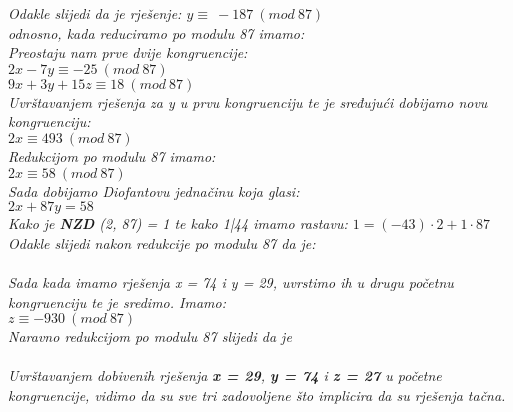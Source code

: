 \documentclass[12pt]{article}
\begin{document}
\begin{enumerate}
\begin{center}
        \textit{Odakle slijedi da je rješenje: $y \equiv \ -187 \ (mod\ 87)$\\ odnosno, kada reduciramo po modulu 87 imamo: }
        \vspace*{0.25cm}
        \textit{\\Preostaju nam prve dvije kongruencije:\\$2x - 7y \equiv -25\ (mod\ 87)$\\$9x + 3y + 15z \equiv 18\ (mod\ 87)$\\Uvrštavanjem rješenja za y u prvu kongruenciju te je sređujući dobijamo novu kongruenciju:\\$2x \equiv 493\ (mod\ 87)$\\ \vspace*{0.25cm}Redukcijom po modulu 87 imamo:\\$2x \equiv 58\ (mod\ 87)$\\\vspace*{0.25cm}Sada dobijamo Diofantovu jednačinu koja glasi:\\$2x + 87y = 58$\\\vspace*{0.25cm}
        Kako je \textbf{NZD} (2, 87) = 1 te kako 1|44 imamo rastavu:
        $1 = (-43) \cdot 2 + 1 \cdot 87$\\}
           \vspace*{0.25cm}
           \textit{Odakle slijedi nakon redukcije po modulu 87 da je:\\ \\}
           \vspace{0.25cm}
           \textit{Sada kada imamo rješenja x = 74 i y = 29, uvrstimo ih u drugu početnu kongruenciju te je sredimo. Imamo:\\
           $z \equiv -930 \ (mod\ 87)$\\ Naravno redukcijom po modulu 87 slijedi da je\\
           }
           \vspace*{0.25cm}
           \textit{\\
           }
            \vspace*{0.25cm}
           \textit{Uvrštavanjem dobivenih rješenja \textbf{x = 29}, \textbf{y = 74} i \textbf{z = 27}  u početne kongruencije, vidimo da su sve tri zadovoljene što implicira da su rješenja tačna.
           }
            \vspace*{0.75cm}
    

\end{center}
\end{enumerate}
\end{document}
